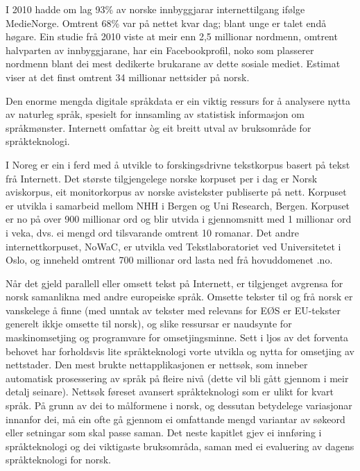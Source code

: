 \begin{multicols}{2}
I 2010 hadde om lag 93\% av norske innbyggjarar internettilgang ifølge MedieNorge. 
Omtrent 68\% var på nettet kvar dag; blant unge er talet endå høgare. 
Ein studie frå 2010 viste at meir enn 2,5 millionar nordmenn, omtrent halvparten av innbyggjarane, har ein Facebookprofil, noko som plasserer nordmenn blant dei mest dedikerte brukarane av dette sosiale mediet. 
Estimat viser at det finst omtrent 34 millionar nettsider på norsk. 


Den enorme mengda digitale språkdata er ein viktig ressurs for å analysere nytta av naturleg språk, spesielt for innsamling av statistisk informasjon om språkmønster. Internett omfattar òg eit breitt utval av bruksområde for språkteknologi. 

I Noreg er ein i ferd med å utvikle to forskingsdrivne tekstkorpus basert på tekst frå Internett. 
Det største tilgjengelege norske korpuset per i dag er Norsk aviskorpus, eit monitorkorpus av norske avistekster publiserte på nett. 
Korpuset er utvikla i samarbeid mellom NHH i Bergen og Uni Research, Bergen. Korpuset er no på over 900 millionar ord og blir utvida i gjennomsnitt med 1 millionar ord i veka, dvs. ei mengd ord tilsvarande omtrent 10 romanar. 
Det andre internettkorpuset, NoWaC, er utvikla ved Tekstlaboratoriet ved Universitetet i Oslo, og inneheld omtrent 700 millionar ord lasta ned frå hovuddomenet .no. 

Når det gjeld parallell eller omsett tekst på Internett, er tilgjenget avgrensa for norsk samanlikna med andre europeiske språk. 
Omsette tekster til og frå norsk er vanskelege å finne (med unntak av tekster med relevans for EØS er EU-tekster generelt ikkje omsette til norsk), og slike ressursar er naudsynte for maskinomsetjing og programvare for omsetjingsminne. 
Sett i ljos av det forventa behovet har forholdsvis lite språkteknologi vorte utvikla og nytta for omsetjing av nettstader. 
Den mest brukte nettapplikasjonen er nettsøk, som inneber automatisk prosessering av språk på fleire nivå (dette vil bli gått gjennom i meir detalj seinare). Nettsøk føreset avansert språkteknologi som er ulikt for kvart språk. 
På grunn av dei to målformene i norsk, og dessutan betydelege variasjonar innanfor dei, må ein ofte gå gjennom ei omfattande mengd variantar av søkeord eller setningar som skal passe saman. 
Det neste kapitlet gjev ei innføring i språkteknologi og dei viktigaste bruksområda, saman med ei evaluering av dagens språkteknologi for norsk.

\end{multicols}

